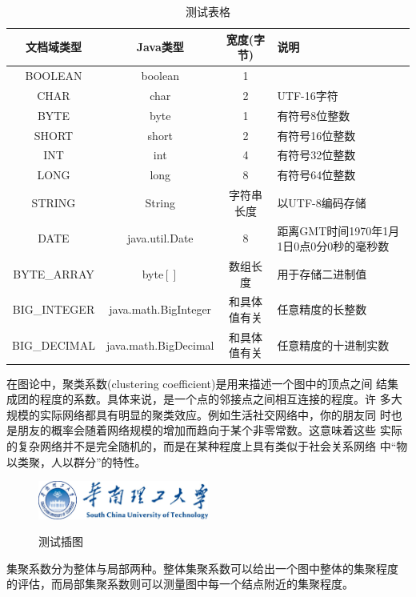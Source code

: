 \documentclass[phd,nobackinfo]{scutthesis}
\begin{document}
\begin{table}
  \centering
  \begin{tabular}{cccp{38mm}}
    \toprule
    \textbf{文档域类型} & \textbf{Java类型} & \textbf{宽度(字节)} & \textbf{说明} \\
    \midrule
    BOOLEAN  & boolean &  1  & \\
    CHAR     & char    &  2  & UTF-16字符 \\
    BYTE     & byte    &  1  & 有符号8位整数 \\
    SHORT    & short   &  2  & 有符号16位整数 \\
    INT      & int     &  4  & 有符号32位整数 \\
    LONG     & long    &  8  & 有符号64位整数 \\
    STRING   & String  &  字符串长度  & 以UTF-8编码存储 \\
    DATE     & java.util.Date & 8 & 距离GMT时间1970年1月1日0点0分0秒的毫秒数 \\
    BYTE\_ARRAY & byte$[]$ & 数组长度 & 用于存储二进制值 \\
    BIG\_INTEGER & java.math.BigInteger & 和具体值有关 & 任意精度的长整数 \\
    BIG\_DECIMAL & java.math.BigDecimal & 和具体值有关 & 任意精度的十进制实数 \\
    \bottomrule
  \end{tabular}
  \caption{测试表格}\label{table:test3}
\end{table}

在图论中，聚类系数(clustering coefficient)是用来描述一个图中的顶点之间
结集成团的程度的系数。具体来说，是一个点的邻接点之间相互连接的程度。许
多大规模的实际网络都具有明显的聚类效应。例如生活社交网络中，你的朋友同
时也是朋友的概率会随着网络规模的增加而趋向于某个非零常数。这意味着这些
实际的复杂网络并不是完全随机的，而是在某种程度上具有类似于社会关系网络
中“物以类聚，人以群分”的特性。

\begin{figure}[htbp]
  \centering
  \includegraphics[width= 0.5\textwidth]{scutlogo.eps}\\
  \caption{测试插图}\label{fig:test4}
\end{figure}

集聚系数分为整体与局部两种。整体集聚系数可以给出一个图中整体的集聚程度
的评估，而局部集聚系数则可以测量图中每一个结点附近的集聚程度。
\end{document}
